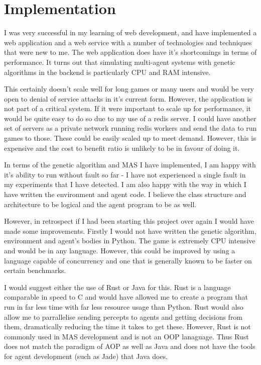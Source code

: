 \documentclass[]{final_report}
\begin{document}
\section{Implementation}
I was very successful in my learning of web development, and have implemented a web application and a web service with a number of technologies and techniques that were new to me. The web application does have it's shortcomings in terms of performance. It turns out that simulating multi-agent systems with genetic algorithms in the backend is particularly CPU and RAM intensive.\par 
This certainly doesn't scale well for long games or many users and would be very open to denial of service attacks in it's current form. However, the application is not part of a critical system. If it were important to scale up for performance, it would be quite easy to do so due to my use of a redis server. I could have another set of servers as a private network running redis workers and send the data to run games to those. These could be easily scaled up to meet demand. However, this is expensive and the cost to benefit ratio is unlikely to be in favour of doing it.\par
In terms of the genetic algorithm and MAS I have implemented, I am happy with it's ability to run without fault so far - I have not experienced a single fault in my experiments that I have detected. I am also happy with the way in which I have written the environment and agent code. I believe the class structure and architecture to be logical and the agent program to be as well.\par
However, in retrospect if I had been starting this project over again I would have made some improvements. Firstly I would not have written the genetic algorithm, environment and agent's bodies in Python. The game is extremely CPU intensive and would be in any language. However, this could be improved by using a language capable of concurrency and one that is generally known to be faster on certain benchmarks.\par 
I would suggest either the use of Rust or Java for this. Rust is a language comparable in speed to C and would have allowed me to create a program that run in far less time with far less resource usage than Python. Rust would also allow me to parrallelise sending percepts to agents and getting decisions from them, dramatically reducing the time it takes to get these. However, Rust is not commonly used in MAS development and is not an OOP lanaguage. Thus Rust does not match the paradigm of AOP as well as Java and does not have the tools for agent development (such as Jade) that Java does.\par 
\end{document}
